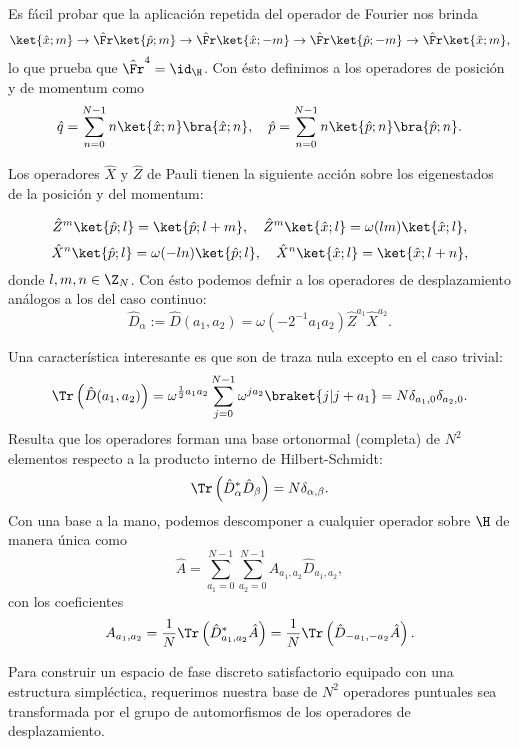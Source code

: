   Es fácil probar que la aplicación repetida del operador de
  Fourier nos brinda
  \[
    \ket{\hat{x};m}
    \rightarrow{\hat{\Fr}}
    \ket{\hat{p};m}
    \rightarrow{\hat{\Fr}}
    \ket{\hat{x};-m}
    \rightarrow{\hat{\Fr}}
    \ket{\hat{p};-m}
    \rightarrow{\hat{\Fr}}
    \ket{\hat{x};m},
  \] 
  lo que prueba que $\hat{\Fr}^{4} = \id_{\H}$. Con ésto
  definimos a los operadores de posición y de momentum como
  \begin{equation}
    \hat{q}
    = \sum_{n=0}^{N-1} n \ket{\hat{x};n} \bra{\hat{x};n},
    \quad
    \hat{p}
    = \sum_{n=0}^{N-1} n \ket{\hat{p};n} \bra{\hat{p};n}.
  \end{equation}

  Los operadores $\hat{X}$ y $\hat{Z}$ de Pauli tienen la
  siguiente acción sobre los eigenestados de la posición y
  del momentum:

  \[
    \hat{Z}^{m}\ket{\hat{p};l}
    = \ket{\hat{p};l+m},
    \quad
    \hat{Z}^{m}\ket{\hat{x};l}
    = \omega(lm) \ket{\hat{x};l},
  \] 
  \[
    \hat{X}^{n}\ket{\hat{p};l}
    = \omega(-l n)\ket{\hat{p};l},
    \quad
    \hat{X}^{n}\ket{\hat{x};l}
    = \ket{\hat{x};l+n},
  \] 
  donde $l,m,n \in \Z_N$. Con ésto podemos defnir a los
  operadores de desplazamiento análogos a los del caso
  continuo:
  \begin{equation}
    \hat{D}_{\alpha}
    := \hat{D}(a_1,a_2)
    = \omega(-2^{-1} a_1 a_2) \hat{Z}^{a_1} \hat{X}^{a_2}.
  \end{equation}

  Una característica interesante es que son de traza nula
  excepto en el caso trivial:
  \[
    \Tr\left( \hat{D}(a_1,a_2) \right) 
    = \omega^{\frac{1}{2}a_1a_2} \sum_{j=0}^{N-1}
    \omega^{ja_2} \braket{j|j+a_1}
    = N \delta_{a_1,0} \delta_{a_2,0}.
  \] 
  Resulta que los operadores forman una base ortonormal
  (completa) de $N^2$ elementos respecto a la producto
  interno de Hilbert-Schmidt:
  \[
    \Tr\left( \hat{D}_\alpha^{*} \hat{D}_\beta \right) 
    = N \delta_{\alpha,\beta}.
  \] 
  Con una base a la mano, podemos descomponer a cualquier
  operador sobre $\H$ de manera única como
  \[
    \hat{A}
    = \sum_{a_1=0}^{N-1} \sum_{a_2=0}^{N-1} A_{a_1,a_2}
    \hat{D}_{a_1,a_2},
  \] 
  con los coeficientes
  \[
    A_{a_1,a_2}
    = \frac{1}{N} \Tr\left( \hat{D}_{a_1,a_2}^{*} \hat{A}
    \right)
    = \frac{1}{N} \Tr\left( \hat{D}_{-a_1,-a_2} \hat{A}
    \right).
  \] 

  Para construir un espacio de fase discreto satisfactorio
  equipado con una estructura simpléctica, requerimos
  nuestra base de $N^2$ operadores puntuales sea
  transformada por el grupo de automorfismos de los
  operadores de desplazamiento.

